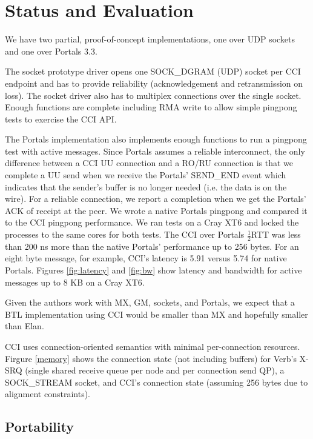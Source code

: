 
\section{Status and Evaluation}
We have two partial, proof-of-concept implementations, one over UDP sockets and
one over Portals 3.3.

The socket prototype driver opens one SOCK\_DGRAM (UDP) socket per CCI endpoint
and has to provide reliability (acknowledgement and retransmission on loss).
The socket driver also has to multiplex connections over the single socket.
Enough functions are complete including RMA write to allow simple pingpong
tests to exercise the CCI API.

The Portals implementation also implements enough functions to run a pingpong
test with active messages. Since Portals assumes a reliable interconnect, the
only difference between a CCI UU connection and a RO/RU connection is that we
complete a UU send when we receive the Portals' SEND\_END event which indicates
that the sender's buffer is no longer needed (i.e. the data is on the wire).
For a reliable connection, we report a completion when we get the Portals' ACK
of receipt at the peer. We wrote a native Portals pingpong and compared it to
the CCI pingpong performance. We ran tests on a Cray XT6 and locked the
processes to the same cores for both tests. The CCI over Portals
\begin{math}\frac{1}{2}\end{math}RTT was less than 200 ns more than the native
Portals' performance up to 256 bytes. For an eight byte message, for example,
CCI's latency is 5.91 \us versus 5.74 \us for native Portals. Figures
\ref{fig:latency} and \ref{fig:bw} show latency and bandwidth for active messages
up to 8 KB on a Cray XT6.

Given the authors work with MX, GM, sockets, and Portals, we expect that a BTL
implementation using CCI would be smaller than MX and hopefully smaller than
Elan.

CCI uses connection-oriented semantics with minimal per-connection resources.
Firgure \ref{memory} shows the connection state (not including buffers) for
Verb's X-SRQ (single shared receive queue per node and per connection send QP),
a SOCK\_STREAM socket, and CCI's connection state (assuming 256 bytes due to
alignment constraints).

\subsection{Portability}

